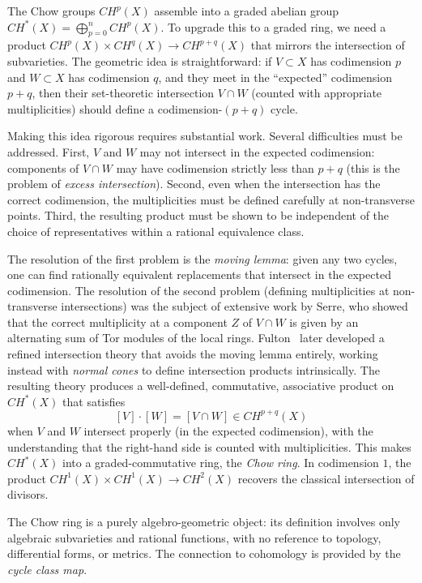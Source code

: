 \documentclass{article}
\begin{document}
The Chow groups $CH^p(X)$ assemble into a graded abelian group
$CH^*(X) = \bigoplus_{p=0}^{n} CH^p(X)$. To upgrade this to a graded ring, we
need a product $CH^p(X) \times CH^q(X) \to CH^{p+q}(X)$ that mirrors the
intersection of subvarieties. The geometric idea is straightforward: if
$V \subset X$ has codimension $p$ and $W \subset X$ has codimension $q$, and
they meet in the ``expected'' codimension $p+q$, then their set-theoretic
intersection $V \cap W$ (counted with appropriate multiplicities) should
define a codimension-$(p+q)$ cycle.

Making this idea rigorous requires substantial work. Several difficulties must
be addressed. First, $V$ and $W$ may not intersect in the expected codimension:
components of $V \cap W$ may have codimension strictly less than $p+q$ (this
is the problem of \emph{excess intersection}). Second, even when the
intersection has the correct codimension, the multiplicities must be defined
carefully at non-transverse points. Third, the resulting product must be shown
to be independent of the choice of representatives within a rational
equivalence class.

The resolution of the first problem is the \emph{moving lemma}: given any two
cycles, one can find rationally equivalent replacements that intersect in the
expected codimension. The resolution of the second problem (defining
multiplicities at non-transverse intersections) was the subject of extensive
work by Serre, who showed that the correct multiplicity at a component $Z$ of
$V \cap W$ is given by an alternating sum of Tor modules of the local rings.
Fulton~\cite{NateAlgGeo} later developed a refined intersection theory that
avoids the moving lemma entirely, working instead with \emph{normal cones} to
define intersection products intrinsically. The resulting theory produces a
well-defined, commutative, associative product on $CH^*(X)$ that satisfies
\[
  [V] \cdot [W] = [V \cap W] \in CH^{p+q}(X)
\]
when $V$ and $W$ intersect properly (in the expected codimension), with the
understanding that the right-hand side is counted with multiplicities. This
makes $CH^*(X)$ into a graded-commutative ring, the \emph{Chow ring}. In
codimension $1$, the product $CH^1(X) \times CH^1(X) \to CH^2(X)$ recovers
the classical intersection of divisors.

The Chow ring is a purely algebro-geometric object: its definition involves
only algebraic subvarieties and rational functions, with no reference to
topology, differential forms, or metrics. The connection to cohomology is
provided by the \emph{cycle class map}.
\end{document}
